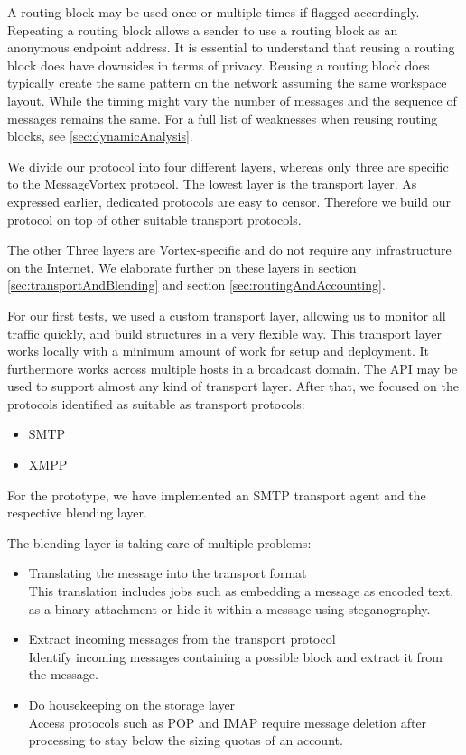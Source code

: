 \documentclass[10pt,journal,compsoc]{IEEEtran}
\begin{document}
A routing block may be used once or multiple times if flagged accordingly. Repeating a routing block allows a sender to use a routing block as an anonymous endpoint address. It is essential to understand that reusing a routing block does have downsides in terms of privacy. Reusing a routing block does typically create the same pattern on the network assuming the same workspace layout. While the timing might vary the number of messages and the sequence of messages remains the same. For a full list of weaknesses when reusing routing blocks, see \ref{sec:dynamicAnalysis}.

We divide our protocol into four different layers, whereas only three are specific to the MessageVortex protocol. The lowest layer is the transport layer. As expressed earlier, dedicated protocols are easy to censor. Therefore we build our protocol on top of other suitable transport protocols. 

The other Three layers are Vortex-specific and do not require any infrastructure on the Internet. We elaborate further on these layers in section \ref{sec:transportAndBlending} and section \ref{sec:routingAndAccounting}.

For our first tests, we used a custom transport layer, allowing us to monitor all traffic quickly, and build structures in a very flexible way. This transport layer works locally with a minimum amount of work for setup and deployment. It furthermore works across multiple hosts in a broadcast domain. The API may be used to support almost any kind of transport layer. After that, we focused on the protocols identified as suitable as transport protocols:
\begin{itemize}
	\item SMTP
	\item XMPP
\end{itemize}
For the prototype, we have implemented an SMTP transport agent and the respective blending layer.

The blending layer is taking care of multiple problems:
\begin{itemize}
	\item Translating the message into the transport format\\
	This translation includes jobs such as embedding a message as encoded text, as a binary attachment or hide it within a message using steganography.
	\item Extract incoming messages from the transport protocol\\
	Identify incoming messages containing a possible block and extract it from the message.
	\item Do housekeeping on the storage layer\\
	Access protocols such as POP and IMAP require message deletion after processing to stay below the sizing quotas of an account.         
\end{itemize}
\end{document}
